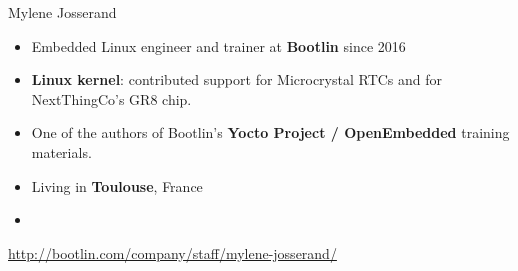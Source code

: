 \begin{frame}{Mylene Josserand}
    \begin{itemize}
	\item Embedded Linux engineer and trainer at {\bf Bootlin}
              since 2016
	\item {\bf Linux kernel}: contributed support for Microcrystal RTCs
	      and for NextThingCo's GR8 chip.
	\item One of the authors of Bootlin's {\bf Yocto Project / OpenEmbedded}
	      training materials.
	\item Living in {\bf Toulouse}, France
	\item {}
    \end{itemize}
    {\small \url{http://bootlin.com/company/staff/mylene-josserand/}}
\end{frame}
